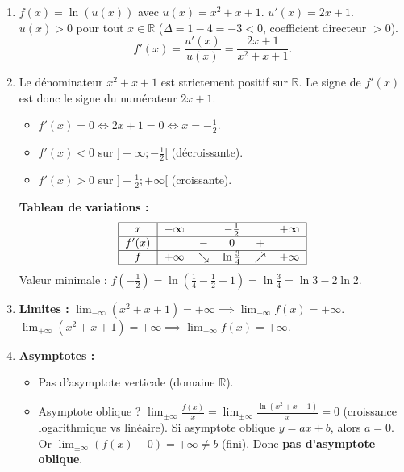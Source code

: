 \documentclass[11pt]{article}
\begin{document}
\begin{corrige}[Exercice 6 — Étude de fonction : $f(x) = \ln(x^2+x+1)$]
\begin{enumerate}
    \item $f(x) = \ln(u(x))$ avec $u(x)=x^2+x+1$. $u'(x)=2x+1$.
    $u(x) > 0$ pour tout $x\in\mathbb{R}$ ($\Delta = 1-4 = -3 < 0$, coefficient directeur $>0$).
    \[
    f'(x) = \frac{u'(x)}{u(x)} = \frac{2x+1}{x^2+x+1}.
    \]
    \item Le dénominateur $x^2+x+1$ est strictement positif sur $\mathbb{R}$.
    Le signe de $f'(x)$ est donc le signe du numérateur $2x+1$.
    \begin{itemize}
        \item $f'(x) = 0 \iff 2x+1=0 \iff x = -\frac{1}{2}$.
        \item $f'(x) < 0$ sur $]-\infty;-\frac{1}{2}[$ (décroissante).
        \item $f'(x) > 0$ sur $]-\frac{1}{2};+\infty[$ (croissante).
    \end{itemize}
    \textbf{Tableau de variations :}
    \[
    \begin{tabular}{|c|ccccc|}\hline
    $x$ & $-\infty$ & & $-\frac{1}{2}$ & & $+\infty$ \\ \hline
    $f'(x)$ & & $-$ & $0$ & $+$ & \\ \hline
    $f$ & $+\infty$ & $\searrow$ & $\ln\frac{3}{4}$ & $\nearrow$ & $+\infty$ \\ \hline
    \end{tabular}
    \]
    Valeur minimale : $f(-\frac{1}{2}) = \ln\left(\frac{1}{4}-\frac{1}{2}+1\right) = \ln\frac{3}{4} = \ln 3 - 2\ln 2$.
    \item \textbf{Limites :}
    $\lim_{-\infty} (x^2+x+1) = +\infty \implies \lim_{-\infty} f(x) = +\infty$.
    $\lim_{+\infty} (x^2+x+1) = +\infty \implies \lim_{+\infty} f(x) = +\infty$.
    \item \textbf{Asymptotes :}
    \begin{itemize}
        \item Pas d'asymptote verticale (domaine $\mathbb{R}$).
        \item Asymptote oblique ? $\lim_{\pm\infty} \frac{f(x)}{x} = \lim_{\pm\infty} \frac{\ln(x^2+x+1)}{x} = 0$ (croissance logarithmique vs linéaire).
        Si asymptote oblique $y=ax+b$, alors $a=0$. Or $\lim_{\pm\infty} (f(x)-0) = +\infty \neq b$ (fini).
        Donc \textbf{pas d'asymptote oblique}.
    \end{itemize}
\end{enumerate}
\end{corrige}
\end{document}
